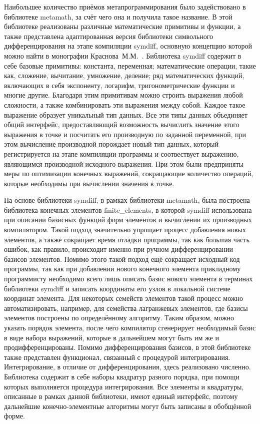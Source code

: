 Наибольшее количество приёмов метапрограммирования было задействовано в библиотеке metamath, за счёт чего она и получила такое название. В этой библиотеке реализованы различные математические примитивы и функции, а также представлена адаптированная версия библиотеки символьного дифференцирования на этапе компиляции symdiff, основную концепцию которой можно найти в монографии Краснова~М.М.~\cite{KrasnovMeta}. Библиотека symdiff содержит в себе базовые примитивы: константа, переменная; математические операции, такие как, сложение, вычитание, умножение, деление; ряд математических функций, включающих в себя экспоненту, логарифм, тригонометрические функции и многие другие. Благодаря этим примитивам можно строить выражения любой сложности, а также комбинировать эти выражения между собой. Каждое такое выражение образует уникальный тип данных. Все эти типы данных объединяет общий интерфейс, предоставляющий возможность вычислить значение этого выражения в точке и посчитать его производную по заданной переменной, при этом вычисление производной порождает новый тип данных, который регистрируется на этапе компиляции программы и соотвествует выражению, являющимся производной исходного выражения. При этом были предприняты меры по оптимизации конечных выражений, сокращающие количество операций, которые необходимы при вычислении значения в точке.

На основе библиотеки symdiff, в рамках библиотеки metamath, была построена библиотека конечных элементов finite\_elements, в которой symdiff использована при описании базисных функций форм элементов и вычислении их производных компилятором. Такой подход значительно упрощает процесс добавления новых элементов, а также сокращает время отладки программы, так как большая часть ошибок, как правило, происходит именно при ручном дифференцировании базисов элементов. Помимо этого такой подход ещё сокращает исходный код программы, так как при добавлении нового конечного элемента прикладному программисту необходимо всего лишь описать базис нового элемента в терминах библиотеки symdiff и записать координаты его узлов в локальной системе координат элемента. Для некоторых семейств элементов такой процесс можно автоматизировать, например, для семейства лагранжевых элементов, где базисы элементов построены по определённому алгоритму. Таким образом, можно указать порядок элемента, после чего компилятор сгенерирует необходимый базис в виде набора выражений, которые в дальнейшем могут быть им же и продифференцированы. Помимо дифференцирования базисов, в этой библиотеке также представлен функционал, связанный с процедурой интегрирования. Интегрирование, в отличие от дифференцирования, здесь реализовано численно. Библиотека содержит в себе наборы квадратур разного порядка, при помощи которых выполняется процедура интегрирования. Все элементы и квадратуры, описанные в рамках данной библиотеки, имеют единый интерфейс, поэтому дальнейшие конечно-элементные алгоритмы могут быть записаны в обобщённой форме.


